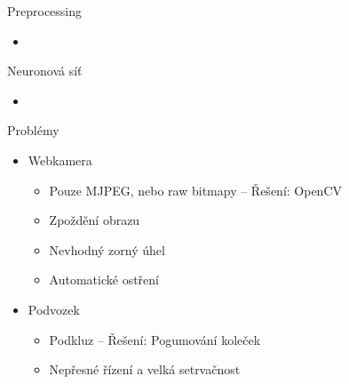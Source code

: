 \documentclass{beamer}
\begin{document}
\begin{frame}{Preprocessing}
\begin{itemize}
\item
\end{itemize}
\end{frame}

\begin{frame}{Neuronová síť}
\begin{itemize}
\item
\end{itemize}
\end{frame}

\begin{frame}{Problémy}
\begin{itemize}
\item Webkamera
	\begin{itemize}
	\item Pouze MJPEG, nebo raw bitmapy -- Řešení: OpenCV
	\item Zpoždění obrazu
	\item Nevhodný zorný úhel
	\item Automatické ostření
	\end{itemize}
\item Podvozek
	\begin{itemize}
	\item Podkluz -- Řešení: Pogumování koleček
	\item Nepřesné řízení a velká setrvačnost
	\end{itemize}
\end{itemize}
\end{frame}
\end{document}
